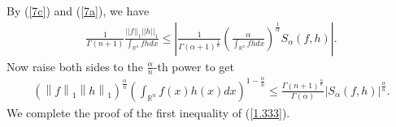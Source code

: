 \documentclass[preprint,12pt]{elsarticle}
\begin{document}
By (\ref{7c}) and (\ref{7a}), we have 
\begin{eqnarray*}
	\frac{1}{\Gamma \left ( n +1 \right)}\frac{{||f||}_{1}{||h||}_{1}}{{\int_{\mathbb{R}^n} }fhdx}
	\le \left|\frac{1}{\Gamma \left ( \alpha  +1 \right )^{\frac{1}{\alpha } }  }\left(\frac{\alpha}{\int_{\mathbb{R}^n} fhdx}\right)^{\frac{1}{\alpha}}{S}_{\alpha }(f,h)\right|.
\end{eqnarray*}
Now raise both sides to the $\frac{\alpha}{n}$-th power to get
\begin{eqnarray*}
	\left ( \left \| f \right \|_{1}\left \| h \right \|_{1}    \right )^{\frac{\alpha }{n} }\left ( \int_{\mathbb{R}^n }f\left ( x \right )h\left ( x \right )dx    \right )^{1-\frac{\alpha }{n} }\le \frac{\Gamma \left ( n+1 \right )^{\frac{\alpha }{n} }  }{\Gamma \left ( \alpha  \right ) }\left | S_{\alpha }\left ( f,h \right )   \right |^{\frac{\alpha }{n} }.
\end{eqnarray*}
We complete the proof of the first inequality of (\ref{1.333}).
\end{document}
